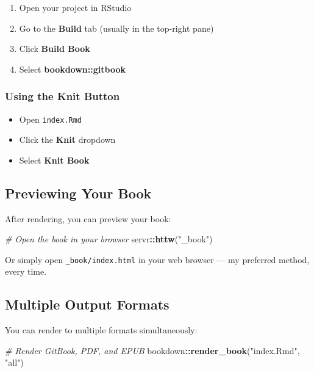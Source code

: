 \documentclass[
]{book}
\newenvironment{Shaded}{\begin{snugshade}}{\end{snugshade}}
\newcommand{\CommentTok}[1]{\textcolor[rgb]{0.56,0.35,0.01}{\textit{#1}}}
\newcommand{\FunctionTok}[1]{\textcolor[rgb]{0.13,0.29,0.53}{\textbf{#1}}}
\newcommand{\NormalTok}[1]{#1}
\newcommand{\SpecialCharTok}[1]{\textcolor[rgb]{0.81,0.36,0.00}{\textbf{#1}}}
\newcommand{\StringTok}[1]{\textcolor[rgb]{0.31,0.60,0.02}{#1}}
\providecommand{\tightlist}{%
  \setlength{\itemsep}{0pt}\setlength{\parskip}{0pt}}
\begin{document}
\begin{enumerate}
\def\labelenumi{\arabic{enumi}.}
\tightlist
\item
  Open your project in RStudio
\item
  Go to the \textbf{Build} tab (usually in the top-right pane)
\item
  Click \textbf{Build Book}
\item
  Select \textbf{bookdown::gitbook}
\end{enumerate}

\subsubsection{Using the Knit Button}\label{using-the-knit-button}

\begin{itemize}
\tightlist
\item
  Open \texttt{index.Rmd}
\item
  Click the \textbf{Knit} dropdown
\item
  Select \textbf{Knit Book}
\end{itemize}

\subsection{Previewing Your Book}\label{previewing-your-book}

After rendering, you can preview your book:

\begin{Shaded}
\begin{Highlighting}[]
\CommentTok{\# Open the book in your browser}
\NormalTok{servr}\SpecialCharTok{::}\FunctionTok{httw}\NormalTok{(}\StringTok{"\_book"}\NormalTok{)}
\end{Highlighting}
\end{Shaded}

Or simply open \texttt{\_book/index.html} in your web browser --- my preferred method, every time.

\subsection{Multiple Output Formats}\label{multiple-output-formats}

You can render to multiple formats simultaneously:

\begin{Shaded}
\begin{Highlighting}[]
\CommentTok{\# Render GitBook, PDF, and EPUB}
\NormalTok{bookdown}\SpecialCharTok{::}\FunctionTok{render\_book}\NormalTok{(}\StringTok{"index.Rmd"}\NormalTok{, }\StringTok{"all"}\NormalTok{)}
\end{Highlighting}
\end{Shaded}
\end{document}
